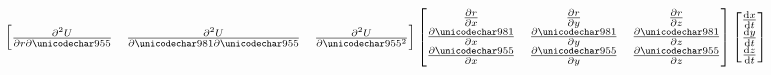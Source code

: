 \begin{equation}
\begin{split}
\begin{bmatrix}
  \prttwob{U}{r}{\lambda} & \prttwob{U}{\phi}{\lambda} & \prttwoa{U}{\lambda}
 \end{bmatrix}
 \begin{bmatrix}
  \prt{r}{x} & \prt{r}{y} & \prt{r}{z}\\ 
  \prt{\phi}{x} & \prt{\phi}{y} & \prt{\phi}{z}\\ 
  \prt{\lambda}{x} & \prt{\lambda}{y} & \prt{\lambda}{z}
 \end{bmatrix}
 \begin{bmatrix}
  \dtv{x}{\tparm} \\ \dtv{y}{\tparm} \\ \dtv{z}{\tparm}  
 \end{bmatrix}
 \end{split}
\end{equation}
